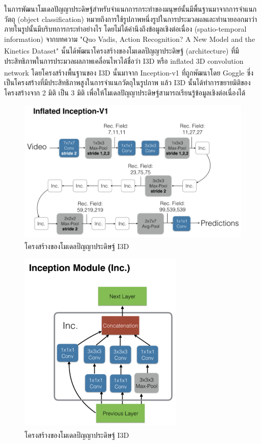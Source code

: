 ในการพัฒนาโมเดลปัญญาประดิษฐ์สำหรับจำแนกการกระทำของมนุษย์นั้นมีพื้นฐานมาจากการจำแนกวัตถุ (object classification)
หมายถึงการใช้รูปภาพหนึ่งรูปในการประมวลผลและทำนายออกมาว่าภายในรูปนั้นมีบริบทการกระทำอย่างไร โดยไม่ได้คำนึงถึงข้อมูลเชิงต่อเนื่อง (spatio-temporal information)
จากบทความ "Quo Vadis, Action Recognition? A New Model and the Kinetics Dataset"\textsuperscript{\cite{I3D}} นั้นได้พัฒนาโครงสร้างของโมเดลปัญญาประดิษฐ์ (architecture) 
ที่มีประสิทธิภาพในการประมวลผลภาพเคลื่อนไหวได้ชื่อว่า I3D หรือ inflated 3D convolution network
โดยโครงสร้างพื้นฐานของ I3D นั้นมาจาก Inception-v1\textsuperscript{\cite{Inception}} ที่ถูกพัฒนาโดย Goggle ซึ่งเป็นโครงสร้างที่มีประสิทธิภาพสูงในการจำแนกวัตถุในรูปภาพ
แล้ว I3D นั้นได้ทำการขยายมิติของโครงสร้างจาก 2 มิติ เป็น 3 มิติ เพื่อให้โมเดลปัญญาประดิษฐ์สามารถเรียนรู้ข้อมูลเชิงต่อเนื่องได้
\begin{figure}[!ht]
    \centering
    \includegraphics[width=1.0\textwidth]{chapter2/images/I3D.png}
    \caption{โครงสร้างของโมเดลปัญญาประดิษฐ์ I3D\textsuperscript{\cite{I3D}}}
    \label{fig:I3DArch}
\end{figure}

\begin{figure}[!ht]
    \centering
    \includegraphics[width=0.7\textwidth]{chapter2/images/inceptionModule.png}
    \caption{โครงสร้างของโมเดลปัญญาประดิษฐ์ I3D\textsuperscript{\cite{I3D}}}
    \label{fig:I3DArch}
\end{figure}
